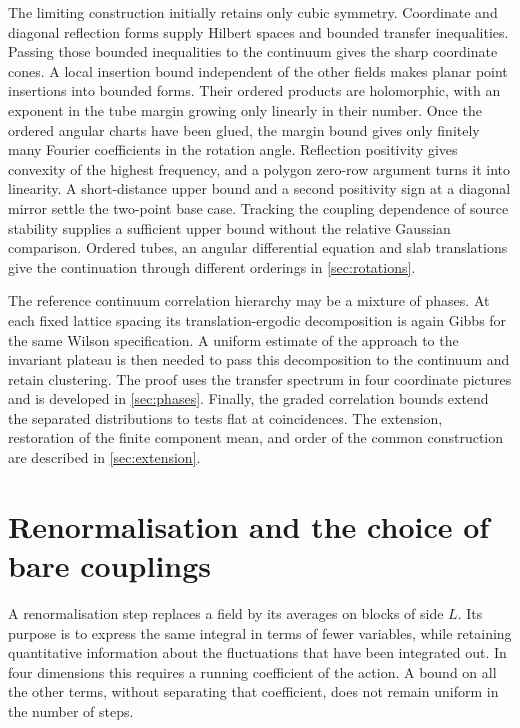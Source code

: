 \documentclass[11pt,letterpaper,reqno]{amsart}
\theoremstyle{definition}
\theoremstyle{remark}
\begin{document}
The limiting construction initially retains only cubic symmetry.
Coordinate and diagonal reflection forms supply Hilbert spaces and
bounded transfer inequalities. Passing those bounded inequalities to
the continuum gives the sharp coordinate cones. A local insertion
bound independent of the other fields makes planar point insertions
into bounded forms. Their ordered products are holomorphic, with an
exponent in the tube margin growing only linearly in their number.
Once the ordered angular charts have been glued, the margin bound
gives only finitely many Fourier coefficients in the rotation angle. Reflection positivity gives convexity of the
highest frequency, and a polygon zero-row argument turns it into
linearity. A short-distance upper bound and a second positivity sign
at a diagonal mirror settle the two-point base case. Tracking the
coupling dependence of source stability supplies a sufficient upper
bound without the relative Gaussian comparison. Ordered tubes, an
angular differential equation and slab translations give the
continuation through different orderings in \cref{sec:rotations}.

The reference continuum correlation hierarchy may be a mixture of phases. At each
fixed lattice spacing its translation-ergodic decomposition is again
Gibbs for the same Wilson specification. A uniform estimate of the
approach to the invariant plateau is then needed to pass this
decomposition to the continuum and retain clustering. The proof uses
the transfer spectrum in four coordinate pictures and is developed
in \cref{sec:phases}. Finally, the graded correlation bounds extend
the separated distributions to tests flat at coincidences. The
extension, restoration of the finite component mean, and order of
the common construction are described in \cref{sec:extension}.

\section{Renormalisation and the choice of bare couplings}\label{sec:rg}

A renormalisation step replaces a field by its averages on blocks of
side $L$. Its purpose is to express the same integral in terms of fewer
variables, while retaining quantitative information about the
fluctuations that have been integrated out. In four dimensions this
requires a running coefficient of the action. A bound on all the other
terms, without separating that coefficient, does not remain uniform in
the number of steps.
\end{document}
